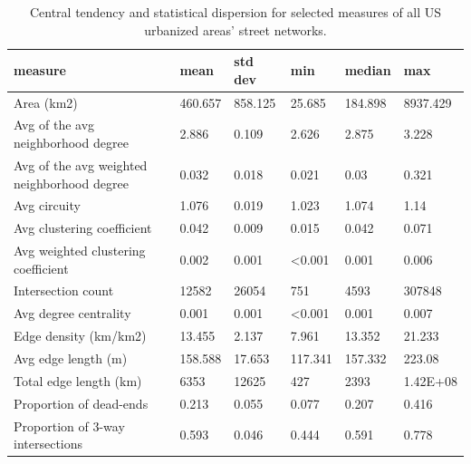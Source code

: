 \documentclass{article}
\begin{document}
\begin{table}
\centering
\caption{Central tendency and statistical dispersion for selected measures of all US urbanized areas' street networks.}
\label{table01}
\begin{tabular}{llllll}
	\toprule
	measure                                     & mean           & std dev        & min            & median         & max            \\
	\midrule
	Area (km2)                                  & 460.657        & 858.125        & 25.685         & 184.898        & 8937.429       \\
	Avg of the avg neighborhood degree          & 2.886          & 0.109          & 2.626          & 2.875          & 3.228          \\
	Avg of the avg weighted neighborhood degree & 0.032          & 0.018          & 0.021          & 0.03           & 0.321          \\
	Avg circuity                                & 1.076          & 0.019          & 1.023          & 1.074          & 1.14           \\
	Avg clustering coefficient                  & 0.042          & 0.009          & 0.015          & 0.042          & 0.071          \\
	Avg weighted clustering coefficient         & 0.002          & 0.001          & \textless0.001 & 0.001          & 0.006          \\
	Intersection count                          & 12582          & 26054          & 751            & 4593           & 307848         \\
	Avg degree centrality                       & 0.001          & 0.001          & \textless0.001 & 0.001          & 0.007          \\
	Edge density (km/km2)                       & 13.455         & 2.137          & 7.961          & 13.352         & 21.233         \\
	Avg edge length (m)                         & 158.588        & 17.653         & 117.341        & 157.332        & 223.08         \\
	Total edge length (km)                      & 6353           & 12625          & 427            & 2393           & 1.42E+08       \\
	Proportion of dead-ends                     & 0.213          & 0.055          & 0.077          & 0.207          & 0.416          \\
	Proportion of 3-way intersections           & 0.593          & 0.046          & 0.444          & 0.591          & 0.778          \\

\end{tabular}
\end{table}
\end{document}
